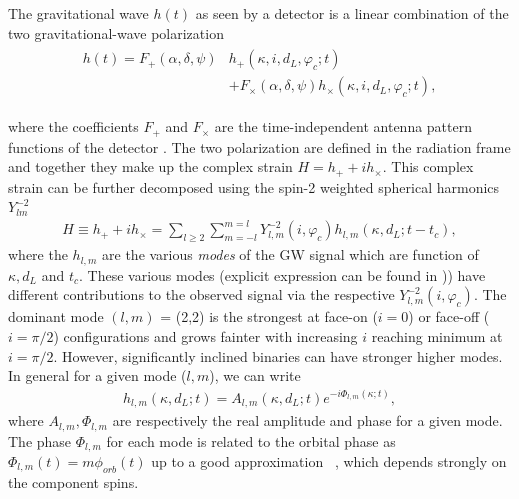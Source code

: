 The gravitational wave $h(t)$ as seen by a detector is a linear combination of the two gravitational-wave polarization
\begin{align} 
    \begin{aligned}
    h(t) = F_{+}(\alpha, \delta, \psi) & h_{+}(\kappa, i, d_L, \varphi_c; t) \\ & + F_{\times}(\alpha, \delta, \psi)h_{\times}(\kappa, i, d_L, \varphi_c; t),
    \end{aligned}
    \label{Eq:Detector_response}
\end{align}

where the coefficients $F_{+}$ and $F_{\times}$ are the time-independent antenna pattern functions of the detector \cite{Finn:1992xs, Jaranowski:1998qm}. The two polarization are defined in the radiation frame and together they make up the complex strain $H = h_{+} + i h_{\times}$. This complex strain can be further decomposed using the spin-2 weighted spherical harmonics $Y^{-2}_{lm}$ \cite{Spin-weighted-harmonics}
\begin{align}
        \label{Eq:spherical_harmonics}
    H \equiv h_+ + ih_{\times} = \sum_{l\geq2}\sum_{m=-l}^{m=l} Y^{-2}_{l,m}(i, \varphi_c) h_{l,m}(\kappa, d_L ;t-t_c),
\end{align}
where the $h_{l,m}$ are the various \textit{modes} of the GW signal which are function of $\kappa, d_L$ and $t_c$. These various modes  (explicit expression can be found in \cite{Mills:2020thr})) have different contributions to the observed signal via the respective $Y^{-2}_{l,m}(i, \varphi_c)$. The dominant mode $(l,m)$ = (2,2) is the strongest at face-on ($i=0$) or face-off ($i = \pi/2$) configurations and grows fainter with increasing $i$ reaching minimum at $i = \pi/2$. However, significantly inclined binaries can have stronger higher modes. In general for a given mode ($l, m$), we can write  
\begin{align}
    h_{l,m}(\kappa, d_L; t) = A_{l,m}(\kappa, d_L; t)e^{-i\Phi_{l,m}(\kappa;t)},
    \label{Eq:single_mode}
\end{align} 
where $A_{l,m}, \Phi_{l,m}$ are respectively the real amplitude and phase for a given mode. The phase $\Phi_{l, m}$ for each mode is related to the orbital phase as $\Phi_{l,m}(t) = m\phi_{orb}(t)$ up to a good approximation ~\cite{Apostolatos:1994mx}, which depends strongly on the component spins.

